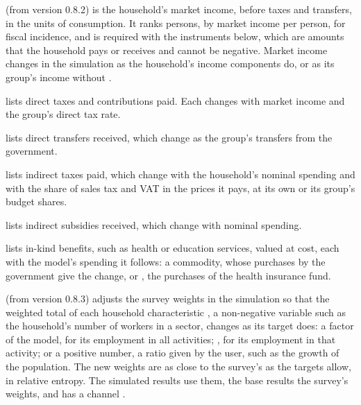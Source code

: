 \begin{optdesc}
\item[\optarg{mark}{et}{varname}] (from version 0.8.2) is the household's
market income, before taxes and transfers, in the units of consumption. It
ranks persons, by market income per person, for fiscal incidence, and is
required with the instruments below, which are amounts that the household
pays or receives and cannot be negative. Market income changes in the
simulation as the household's income components do, or as its group's
income without .

\item[\optarg{dt}{ax}{varlist}] lists direct taxes and contributions paid.
Each changes with market income and the group's direct tax rate.

\item[\optarg{trans}{fers}{varlist}] lists direct transfers received, which
change as the group's transfers from the government.

\item[\optarg{it}{ax}{varlist}] lists indirect taxes paid, which change with
the household's nominal spending and with the share of sales tax and VAT in
the prices it pays, at its own or its group's budget shares.

\item[\optarg{sub}{sidies}{varlist}] lists indirect subsidies received, which
change with nominal spending.

\item[\optarg{ink}{ind}{var\texttt{:}target \ldots}] lists in-kind benefits,
such as health or education services, valued at cost, each with the model's
spending it follows: a commodity, whose purchases by the government give the
change, or , the purchases of the health insurance fund.

\item[\optarg{rew}{eight}{var\texttt{:}target \ldots}] (from version 0.8.3)
adjusts the survey weights in the simulation so that the weighted total of
each household characteristic , a non-negative variable such as
the household's number of workers in a sector, changes as its target does: a
factor of the model, for its employment in all activities;
, for its employment in that activity; or a
positive number, a ratio given by the user, such as the growth of the
population. The new weights are as close to the survey's as the targets
allow, in relative entropy. The simulated results use them, the base results
the survey's weights, and  has a channel .


\end{optdesc}
